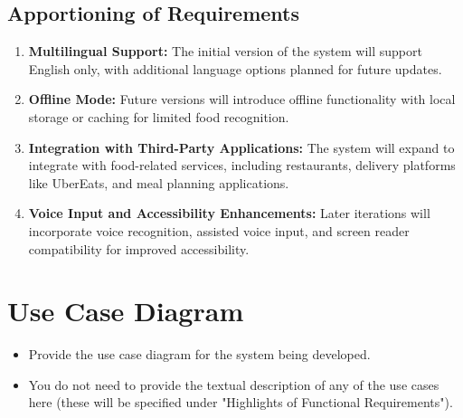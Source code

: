 \documentclass[]{article}
\begin{document}

\subsection{Apportioning of Requirements}
\label{sub:apportioning_of_requirements}
\begin{enumerate}
    \item \textbf{Multilingual Support:} The initial version of the system will support English only, with additional language options planned for future updates.
    \item \textbf{Offline Mode:} Future versions will introduce offline functionality with local storage or caching for limited food recognition.
    \item \textbf{Integration with Third-Party Applications:} The system will expand to integrate with food-related services, including restaurants, delivery platforms like UberEats, and meal planning applications.
    \item \textbf{Voice Input and Accessibility Enhancements:} Later iterations will incorporate voice recognition, assisted voice input, and screen reader compatibility for improved accessibility.
\end{enumerate}

\section{Use Case Diagram}
\label{sec:use_case_diagram}
\begin{itemize}
	\item Provide the use case diagram for the system being developed.
	\item You do not need to provide the textual description of any of the use cases here (these will be specified under "Highlights of Functional Requirements").
\end{itemize}
\end{document}
